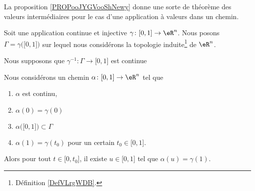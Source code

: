 La proposition \ref{PROPooJYGVooShNewy} donne une sorte de théorème des valeurs intermédiaires pour le cas d'une application à valeurs dans un chemin.
\begin{proposition}     \label{PROPooJYGVooShNewy}
	Soit une application continue et injective \( \gamma\colon \mathopen[ 0 , 1 \mathclose]\to \eR^n\). Nous posons \( \Gamma=\gamma\big( \mathopen[ 0 , 1 \mathclose] \big)\) sur lequel nous considérons la topologie induite\footnote{Définition \ref{DefVLrgWDB}.} de \( \eR^n\).

	Nous supposons que \( \gamma^{-1}\colon \Gamma\to \mathopen[ 0 , 1 \mathclose]\) est continue

	Nous considérons un chemin \( \alpha\colon \mathopen[ 0 , 1 \mathclose]\to \eR^n\) tel que
	\begin{enumerate}
		\item
		      \( \alpha\) est continu,
		\item
		      \( \alpha(0)=\gamma(0)\)
		\item
		      \( \alpha\big( \mathopen[ 0 , 1 \mathclose] \big)\subset \Gamma\)
		\item
		      \( \alpha(1)=\gamma(t_0)\) pour un certain \( t_0\in \mathopen[ 0 , 1 \mathclose]\).
	\end{enumerate}
	Alors pour tout \( t\in\mathopen[ 0 , t_0 \mathclose]\), il existe \( u\in\mathopen[ 0 , 1 \mathclose]\) tel que \( \alpha(u)=\gamma(1)\).
\end{proposition}

